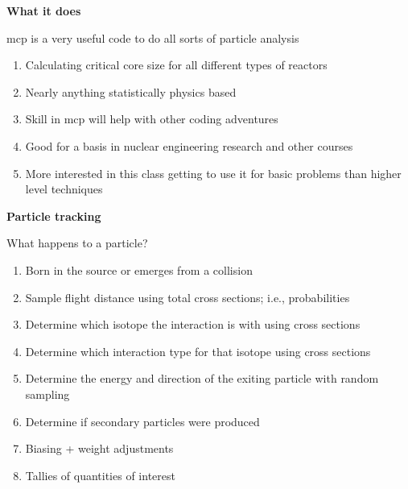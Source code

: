 \documentclass[aspectratio=1610,pdftex,dvipsnames,compress,xcolor={dvipsnames}]{beamer}
\newcommand{\acs}{\acrshort} %
\begin{document}
\begin{frame}[plain]{}
    \centering\LARGE\textbf{What it does}
\end{frame}


\addtocounter{framenumber}{-2} 
\begin{frame}{\acs{mcp} is a very useful code to do all sorts of particle analysis}
    \begin{enumerate}[series=outerlist,topsep=0pt,itemsep=21pt,leftmargin=*,label=(\arabic*)]
        \item[]Calculating critical core size for all different types of reactors
        \item[]Nearly anything statistically physics based
        \item[]Skill in \acs{mcp} will help with other coding adventures
        \item[]Good for a basis in nuclear engineering research and other courses
        \item[]More interested in this class getting to use it for basic problems than higher level techniques
    \end{enumerate}
\end{frame}


\begin{frame}[plain]{}
    \centering\LARGE\textbf{Particle tracking}
\end{frame}


\addtocounter{framenumber}{-1} 
\begin{frame}{What happens to a particle?}
    \begin{enumerate}[series=outerlist,topsep=0pt,itemsep=17pt,leftmargin=*,label=(\arabic*)]
        \item[]Born in the source or emerges from a collision
        \item[]Sample flight distance using total cross sections; i.e., probabilities
        \item[]Determine which isotope the interaction is with using cross sections
        \item[]Determine which interaction type for that isotope using cross sections
        \item[]Determine the energy and direction of the exiting particle with random sampling
        \item[]Determine if secondary particles were produced
        \item[]Biasing + weight adjustments
        \item[]Tallies of quantities of interest
    \end{enumerate}
\end{frame}
\end{document}
